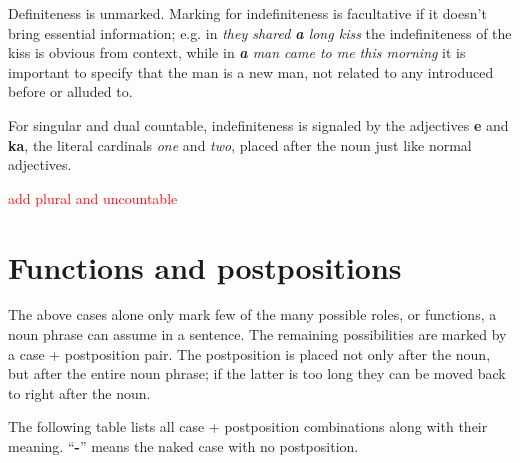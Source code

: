 \documentclass[10pt,oneside]{memoir}
\newcommand{\cmmnt}[1]{\textcolor{red}{#1}}
\begin{document}
Definiteness is unmarked. Marking for indefiniteness is facultative if it doesn't bring essential information; e.g. in \emph{they shared \textbf{a} long kiss} the indefiniteness of the kiss is obvious from context, while in \emph{\textbf{a} man came to me this morning} it is important to specify that the man is a new man, not related to any introduced before or alluded to.

For singular and dual countable, indefiniteness is signaled by the adjectives \textbf{e} and \textbf{ka}, the literal cardinals \emph{one} and \emph{two}, placed after the noun just like normal adjectives. 

\cmmnt{add plural and uncountable}



\pagebreak

\section{Functions and postpositions} \label{prepositions}

The above cases alone only mark few of the many possible roles, or functions, a noun phrase can assume in a sentence. The remaining possibilities are marked by a case + postposition pair. The postposition is placed not only after the noun, but after the entire noun phrase; if the latter is too long they can be moved back to right after the noun.

The following table lists all case + postposition combinations along with their meaning. ``\textbf{-}'' means the naked case with no postposition.

\newcommand{\xline}{\cline{1-2}\cline{4-4}}
\end{document}
